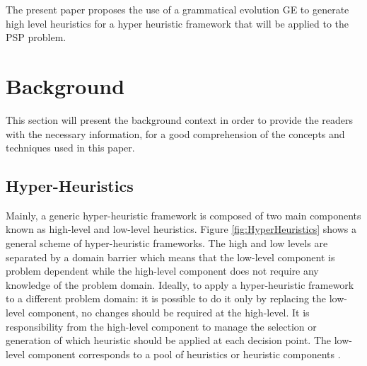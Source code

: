 \documentclass[conference]{IEEEtran}
\begin{document}
The present paper proposes the use of a grammatical evolution GE to generate high level heuristics for a hyper heuristic framework that will be applied to the PSP problem.

\section{Background}
\label{sec:background}

This section will present the background context in order to provide the readers with the necessary information, for a good comprehension of the concepts and techniques used in this paper.  


\subsection{Hyper-Heuristics}
\label{subsec:hyperheuristics}

	Mainly, a generic hyper-heuristic framework is composed of two main components known as high-level and low-level heuristics. Figure \ref{fig:HyperHeuristics} shows a general scheme of hyper-heuristic frameworks. The high and low levels are separated by a domain barrier which means that the low-level component is problem dependent while the high-level component does not require any knowledge of the problem domain. Ideally, to apply a hyper-heuristic framework to a different problem domain: it is possible to do it only by replacing  the low-level component, no changes should be required at the high-level. It is responsibility from the high-level component to manage the selection or generation of which heuristic should be applied at each decision point. The low-level component corresponds to a pool of heuristics or heuristic components \cite{sabar2015automatic}. 
 
\end{document}
